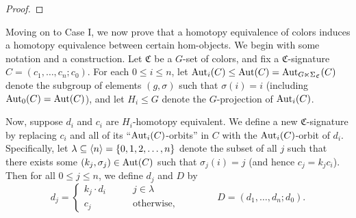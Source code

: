 \documentclass[a4paper,10pt
,draft
]{article}%
\newcommand{\J}{\mathbb J}
\renewcommand{\1}{\eta}%
\begin{document}
\begin{proof}
\end{proof}

Moving on to Case I, we now prove that a homotopy equivalence of colors induces a homotopy equivalence between certain hom-objects.
% 
We begin with some notation and a construction.
Let $\mathfrak C$ be a $G$-set of colors, and fix a $\mathfrak C$-signature $C = (c_1, \dots, c_n; c_0)$.
For each $0 \leq i \leq n$, let $\operatorname{Aut}_i(C) \leq \operatorname{Aut}(C) = \operatorname{Aut}_{G \ltimes \Sigma_{\mathfrak C}}(C)$ denote the subgroup of elements $(g, \sigma)$
such that $\sigma(i) = i$ (including $\operatorname{Aut}_0(C) = \operatorname{Aut}(C)$),
and let $H_i \leq G$ denote the $G$-projection of $\operatorname{Aut}_i(C)$.

Now, suppose $d_i$ and $c_i$ are $H_i$-homotopy equivalent.
We define a new $\mathfrak C$-signature by replacing $c_i$ and all of its ``$\operatorname{Aut}_i(C)$-orbits'' in $C$ with
the $\operatorname{Aut}_i(C)$-orbit of $d_i$.
Specifically, let $\lambda \subseteq \langle n \rangle = \left\{0,1,2,\dots,n\right\}$ denote the subset of all $j$ such that
there exists some $(k_j, \sigma_j) \in \operatorname{Aut}(C)$ such that $\sigma_j(i) = j$ (and hence $c_j = k_j c_i$).
Then for all $0 \leq j \leq n$, we define $d_j$ and $D$ by
\begin{equation}
      \label{DDEF_EQ}
      d_j =
      \begin{cases}
            k_j \cdot d_i \qquad & j \in \lambda
            \\
            c_j & \mbox{otherwise,}
      \end{cases}
      \qquad \qquad
      D = (d_1,\dots, d_n; d_0).
\end{equation}
\end{document}
